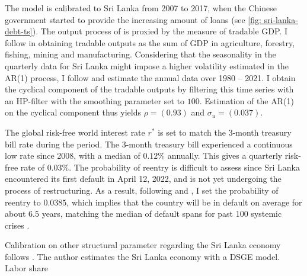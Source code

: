 The model is calibrated to Sri Lanka from 2007 to 2017, when the Chinese government started to provide the increasing amount of loans (see \autoref{fig: sri-lanka-debt-ts}).
The output process of  is proxied by the measure of tradable GDP. I follow \citet{Schmitt-Uribe-16} in obtaining tradable outputs as the sum of GDP in agriculture, forestry, fishing, mining and manufacturing. Considering that the seasonality in the quarterly data for Sri Lanka might impose a higher volatility estimated in the AR(1) process, I follow \citet{Hinrichsen_2020-chapter4} and estimate the annual data over 1980 -- 2021. I obtain the cyclical component of the tradable outputs by filtering this time series with an HP-filter with the smoothing parameter set to $100$.
Estimation of the AR(1) on the cyclical component thus yields $\rho = (0.93)$ and $\sigma_u = (0.037)$.

The global risk-free world interest rate $r^*$ is set to match the 3-month treasury bill rate during the period. The 3-month treasury bill experienced a continuous low rate since 2008, with a median of $0.12\%$ annually. This gives a quarterly risk-free rate of $0.03\%$.
The probability of reentry is difficult to assess since Sri Lanka encountered its first default in April 12, 2022, and is not yet undergoing the process of restructuring. As a result, following \citet*{Chatterjee-12} and \citet*{Hinrichsen_2020-chapter4}, I set the probability of reentry to $0.0385$, which implies that the country will be in default on average for about $6.5$ years, matching the median of default spans for past 100 systemic crises \citep*{Reinhart-Rogoff-2014-100-episode}.

Calibration on other structural parameter regarding the Sri Lanka economy follows \citet*{Jegajeevan-Sri-Lanka-DSGE}. The author estimates the Sri Lanka economy with a DSGE model. Labor share